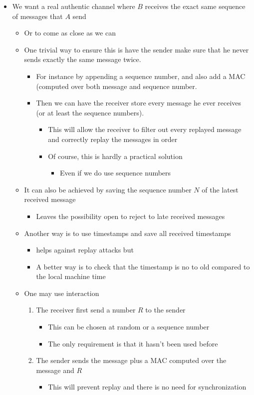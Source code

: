 \documentclass[11pt]{article}
\begin{document}
\begin{itemize}
\item We want a real authentic channel where \(B\) receives the exact same sequence of messages that \(A\) send
\begin{itemize}
\item Or to come as close as we can
\item One trivial way to ensure this is have the sender make sure that he never sends exactly the same message twice.
\begin{itemize}
\item For instance by appending a sequence number, and also add a MAC (computed over both message and sequence number.
\item Then we can have the receiver store every message he ever receives (or at least the sequence numbers).
\begin{itemize}
\item This will allow the receiver to filter out every replayed message and correctly replay the messages in order
\item Of course, this is hardly a practical solution
\begin{itemize}
\item Even if we do use sequence numbers
\end{itemize}
\end{itemize}
\end{itemize}
\item It can also be achieved by saving the sequence number \(N\) of the latest received message
\begin{itemize}
\item Leaves the possibility open to reject to late received messages
\end{itemize}
\item Another way is to use timestamps and save all received timestamps
\begin{itemize}
\item helps against replay attacks but
\item A better way is to check that the timestamp is no to old compared to the local machine time
\end{itemize}
\item One may use interaction
\begin{enumerate}
\item The receiver first send a number \(R\) to the sender
\begin{itemize}
\item This can be chosen at random or a sequence number
\item The only requirement is that it hasn't been used before
\end{itemize}
\item The sender sends the message plus a MAC computed over the message and \(R\)
\begin{itemize}
\item This will prevent replay and there is no need for synchronization
\end{itemize}
\end{enumerate}
\end{itemize}
\end{itemize}
\end{document}
